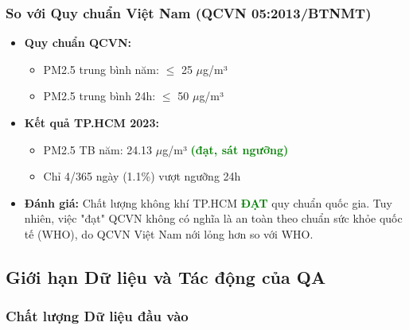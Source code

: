 \documentclass[12pt,a4paper]{article}
\begin{document}
\subsubsection{So với Quy chuẩn Việt Nam (QCVN 05:2013/BTNMT)}

\begin{itemize}
    \item \textbf{Quy chuẩn QCVN:}
    \begin{itemize}
        \item PM2.5 trung bình năm: $\leq$ 25 $\mu$g/m³
        \item PM2.5 trung bình 24h: $\leq$ 50 $\mu$g/m³
    \end{itemize}
    
    \item \textbf{Kết quả TP.HCM 2023:}
    \begin{itemize}
        \item PM2.5 TB năm: 24.13 $\mu$g/m³ \textcolor{green}{\textbf{(đạt, sát ngưỡng)}}
        \item Chỉ 4/365 ngày (1.1\%) vượt ngưỡng 24h
    \end{itemize}
    
    \item \textbf{Đánh giá:} Chất lượng không khí TP.HCM \textcolor{green}{\textbf{ĐẠT}} quy chuẩn quốc gia. Tuy nhiên, việc "đạt" QCVN không có nghĩa là an toàn theo chuẩn sức khỏe quốc tế (WHO), do QCVN Việt Nam nới lỏng hơn so với WHO.
\end{itemize}

\subsection{Giới hạn Dữ liệu và Tác động của QA}

\subsubsection{Chất lượng Dữ liệu đầu vào}
\end{document}
